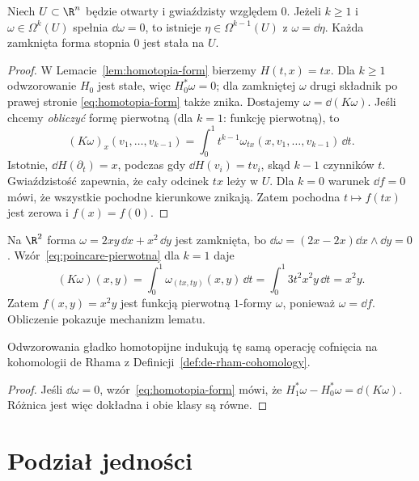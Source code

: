 \begin{twierdzenie}
\label{thm:lemat-poincare-formy}
Niech $U\subset\R^n$ będzie otwarty i gwiaździsty
względem $0$. Jeżeli $k\geq1$ i
$\omega\in\Omega^k(U)$ spełnia $\dd\omega=0$,
to istnieje $\eta\in\Omega^{k-1}(U)$ z
$\omega=\dd\eta$. Każda zamknięta forma stopnia
$0$ jest stała na $U$.
\end{twierdzenie}
\begin{proof}
W Lemacie~\ref{lem:homotopia-form} bierzemy
$H(t,x)=tx$. Dla $k\geq1$ odwzorowanie $H_0$
jest stałe, więc $H_0^*\omega=0$; dla zamkniętej
$\omega$ drugi składnik po prawej stronie
\eqref{eq:homotopia-form} także znika.
Dostajemy $\omega=\dd(K\omega)$.
Jeśli chcemy \emph{obliczyć} formę pierwotną
(dla $k=1$: funkcję pierwotną), to
\begin{equation}\label{eq:poincare-pierwotna}
 (K\omega)_x(v_1,\ldots,v_{k-1})
 =\int_0^1 t^{k-1}
   \omega_{tx}(x,v_1,\ldots,v_{k-1})\,\dd t.
\end{equation}
Istotnie, $\dd H(\partial_t)=x$, podczas gdy
$\dd H(v_i)=tv_i$, skąd $k-1$ czynników $t$.
Gwiaździstość zapewnia, że cały odcinek $tx$ leży w $U$.
Dla $k=0$ warunek $\dd f=0$ mówi, że wszystkie
pochodne kierunkowe znikają. Zatem pochodna
$t\mapsto f(tx)$ jest zerowa i $f(x)=f(0)$.
\end{proof}

\begin{przyklad}
Na $\R^2$ forma $\omega=2xy\,\dd x+x^2\,\dd y$
jest zamknięta, bo
$\dd\omega=(2x-2x)\dd x\wedge\dd y=0$.
Wzór~\eqref{eq:poincare-pierwotna} dla $k=1$ daje
\[
 (K\omega)(x,y)=\int_0^1
 \omega_{(tx,ty)}(x,y)\,\dd t
 =\int_0^1 3t^2x^2y\,\dd t=x^2y.
\]
Zatem $f(x,y)=x^2y$ jest funkcją pierwotną
$1$-formy $\omega$, ponieważ $\omega=\dd f$.
Obliczenie pokazuje mechanizm lematu.
\end{przyklad}

\begin{wniosek}
\label{cor:de-rham-homotopia}
Odwzorowania gładko homotopijne indukują tę samą
operację cofnięcia na kohomologii de Rhama
z Definicji~\ref{def:de-rham-cohomology}.
\end{wniosek}
\begin{proof}
Jeśli $\dd\omega=0$, wzór~\eqref{eq:homotopia-form}
mówi, że $H_1^*\omega-H_0^*\omega=\dd(K\omega)$.
Różnica jest więc dokładna i obie klasy są równe.
\end{proof}

\section{Podział jedności}
\label{sec:formy-podzial-jednosci}

